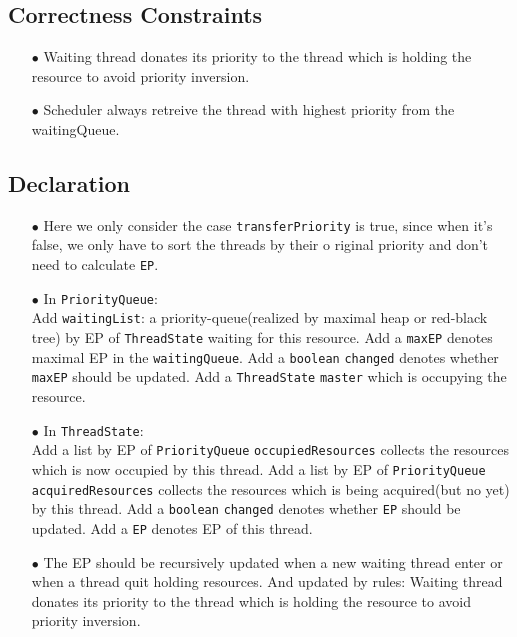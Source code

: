 \documentclass{article}
\begin{document}
\subsection{Correctness Constraints}
\begin{enumerate}
	\item[$\bullet$] Waiting thread donates its priority to the thread which is holding the resource to avoid priority inversion.
	\item[$\bullet$] Scheduler always retreive the thread with highest priority from the waitingQueue.
\end{enumerate}
\subsection{Declaration}
\begin{enumerate}
	\item[$\bullet$] Here we only consider the case \texttt{transferPriority} is true, since when it's false, we only have to sort the threads by 
		their o riginal priority and don't need to calculate \texttt{EP}.
	\item[$\bullet$] In \texttt{PriorityQueue}: \\
		Add \texttt{waitingList}: a priority-queue(realized by maximal heap or red-black tree) by EP of \texttt{ThreadState} waiting for this resource.
		Add a \texttt{maxEP} denotes maximal EP in the \texttt{waitingQueue}.
		Add a \texttt{boolean} \texttt{changed} denotes whether \texttt{maxEP} should be updated.
		Add a \texttt{ThreadState} \texttt{master} which is occupying the resource.
	\item[$\bullet$] In \texttt{ThreadState}: \\
		Add a list by EP of \texttt{PriorityQueue} \texttt{occupiedResources} collects the resources which is now occupied by this thread. 
		Add a list by EP of \texttt{PriorityQueue} \texttt{acquiredResources} collects the resources which is being acquired(but no yet) by this thread.
		Add a \texttt{boolean} \texttt{changed} denotes whether \texttt{EP} should be updated.
		Add a \texttt{EP} denotes EP of this thread.
	\item[$\bullet$] The EP should be recursively updated when a new waiting thread enter or when a thread quit holding resources. 
		And updated by rules: Waiting thread donates its priority to the thread which is holding the resource to avoid priority inversion.
\end{enumerate}
\end{document}
